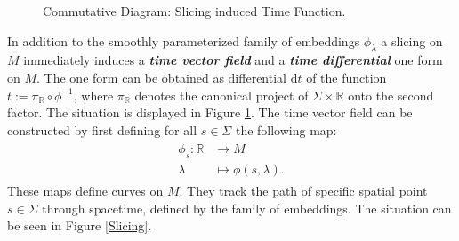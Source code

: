 \begin{figure}[hbt!]
\centering
{} 
\caption{Commutative Diagram: Slicing induced Time Function.}\label{DiagrTime}
\end{figure}

In addition to the smoothly parameterized family of embeddings $\phi_{\lambda}$ a slicing on $M$ immediately induces a \textit{\textbf{time vector field}} and a \textit{\textbf{time differential}} one form on $M$. The one form can be obtained as differential $\mathrm{d}t$ of the function $t:=\pi_{\mathbb{R}} \circ \phi^{-1}$, where $\pi_{\mathbb{R}}$ denotes the canonical project of $\Sigma \times \mathbb{R}$ onto the second factor. The situation is displayed in Figure \ref{DiagrTime}.
The time vector field can be constructed by first defining for all $s \in \Sigma$ the following map: 
\begin{align}
\begin{aligned}
    \phi_s : \mathbb{R} &\longrightarrow M \\
    \lambda &\longmapsto \phi(s,\lambda).
\end{aligned}
\end{align}
These maps define curves on $M$. They track the path of specific spatial point $s \in \Sigma$ through spacetime, defined by the family of embeddings. The situation can be seen in Figure \ref{Slicing}.

